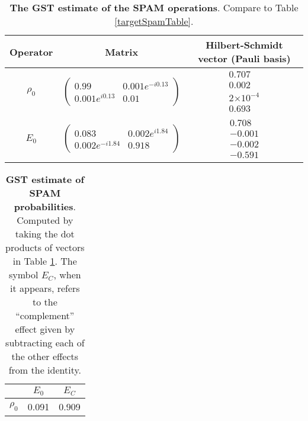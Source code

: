\documentclass{article}[11pt]
\providecommand{\e}[1]{\ensuremath{\times 10^{#1}}}
\begin{document}
\begin{table}[h]
\begin{center}
\begin{tabular}[l]{|c|c|c|}
\hline
Operator & Matrix & Hilbert-Schmidt vector (Pauli basis) \\ \hline
$\rho_{0}$ & $ \left(\!\!\begin{array}{cc}
0.99 & 0.001e^{-i0.13} \\ 
0.001e^{i0.13} & 0.01
 \end{array}\!\!\right) $
 & $ \begin{array}{c}
0.707 \\ 
0.002 \\ 
2\e{-4} \\ 
0.693
 \end{array} $
 \\ \hline
$E_{0}$ & $ \left(\!\!\begin{array}{cc}
0.083 & 0.002e^{i1.84} \\ 
0.002e^{-i1.84} & 0.918
 \end{array}\!\!\right) $
 & $ \begin{array}{c}
0.708 \\ 
-0.001 \\ 
-0.002 \\ 
-0.591
 \end{array} $
 \\ \hline
\end{tabular}

\caption{\textbf{The GST estimate of the SPAM operations}.  Compare to Table \ref{targetSpamTable}.\label{bestGatesetSpamTable}}
\end{center}
\end{table}

\begin{table}[h]
\begin{center}
\begin{tabular}[l]{|c|c|c|}
\hline
 & $E_{0}$ & $E_C$ \\ \hline
$\rho_{0}$ & 0.091 & 0.909 \\ \hline
\end{tabular}

\caption{\textbf{GST estimate of SPAM probabilities}.  Computed by taking the dot products of vectors in Table \ref{bestGatesetSpamTable}.  The symbol $E_C$, when it appears, refers to the ``complement'' effect given by subtracting each of the other effects from the identity.\label{bestGatesetSpamParametersTable}}
\end{center}
\end{table}
\end{document}
